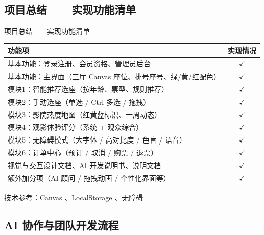 \documentclass{beamer}
\begin{document}
\subsection{项目总结——实现功能清单}

\begin{frame}{项目总结——实现功能清单}
  \begin{table}[htbp]
    \scriptsize
    \centering
    \renewcommand{\arraystretch}{0.94}
    \begin{tabular}{p{}c}
      \toprule
      功能项 & 实现情况 \\
      \midrule
      基本功能：登录注册、会员资格、管理员后台 & $\checkmark$ \\
      基本功能：主界面（三厅 Canvas 座位、排号座号、绿/黄/红配色） & $\checkmark$ \\
      模块1：智能推荐选座（按年龄、票型、规则推荐） & $\checkmark$ \\
      模块2：手动选座（单选 / Ctrl 多选 / 拖拽） & $\checkmark$ \\
      模块3：影院热度地图（红黄蓝标识、一周动态） & $\checkmark$ \\
      模块4：观影体验评分（系统 + 观众综合） & $\checkmark$ \\
      模块5：无障碍模式（大字体 / 高对比度 / 色盲 / 语音） & $\checkmark$ \\
      模块6：订单中心（预订 / 取消 / 购票 / 退票） & $\checkmark$ \\
      视觉与交互设计文档、AI 开发说明书、说明文档 & $\checkmark$ \\
      额外加分项（AI 顾问 / 拖拽动画 / 个性化界面等） & $\checkmark$ \\
      \bottomrule
    \end{tabular}
  \end{table}
  \small 技术参考：Canvas \cite{mdn_canvas}、LocalStorage \cite{mdn_localstorage}、无障碍 \cite{w3c_aria,wcag21}
\end{frame}

\subsection{AI 协作与团队开发流程}
\end{document}
